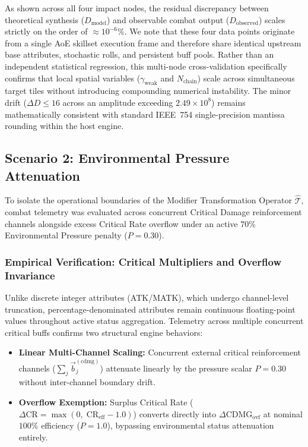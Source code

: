 \documentclass[twocolumn,10pt]{article}
\begin{document}
As shown across all four impact nodes, the residual discrepancy between theoretical synthesis ($D_{\text{model}}$) and observable combat output ($D_{\text{observed}}$) scales strictly on the order of $\approx 10^{-6}\%$. We note that these four data points originate from a single AoE skillset execution frame and therefore share identical upstream base attributes, stochastic rolls, and persistent buff pools. Rather than an independent statistical regression, this multi-node cross-validation specifically confirms that local spatial variables ($\gamma_{\text{weak}}$ and $N_{\text{chain}}$) scale across simultaneous target tiles without introducing compounding numerical instability. The minor drift ($\Delta D \le 16$ across an amplitude exceeding $2.49 \times 10^8$) remains mathematically consistent with standard IEEE~754 single-precision mantissa rounding within the host engine.

\subsection{Scenario 2: Environmental Pressure Attenuation}

To isolate the operational boundaries of the Modifier Transformation Operator $\hat{\mathcal{T}}$, combat telemetry was evaluated across concurrent Critical Damage reinforcement channels alongside excess Critical Rate overflow under an active $70\%$ Environmental Pressure penalty ($P = 0.30$).

\subsubsection{Empirical Verification: Critical Multipliers and Overflow Invariance}

Unlike discrete integer attributes (ATK/MATK), which undergo channel-level truncation, percentage-denominated attributes remain continuous floating-point values throughout active status aggregation. Telemetry across multiple concurrent critical buffs confirms two structural engine behaviors:
\begin{itemize}
    \item \textbf{Linear Multi-Channel Scaling:} Concurrent external critical reinforcement channels ($\sum_j \vec{b}_j^{(\text{cdmg})}$) attenuate linearly by the pressure scalar $P = 0.30$ without inter-channel boundary drift.
    \item \textbf{Overflow Exemption:} Surplus Critical Rate ($\Delta \text{CR} = \max(0, \; \text{CR}_{\text{eff}} - 1.0)$) converts directly into $\Delta \text{CDMG}_{\text{ovf}}$ at nominal $100\%$ efficiency ($P = 1.0$), bypassing environmental status attenuation entirely.
\end{itemize}
\end{document}
